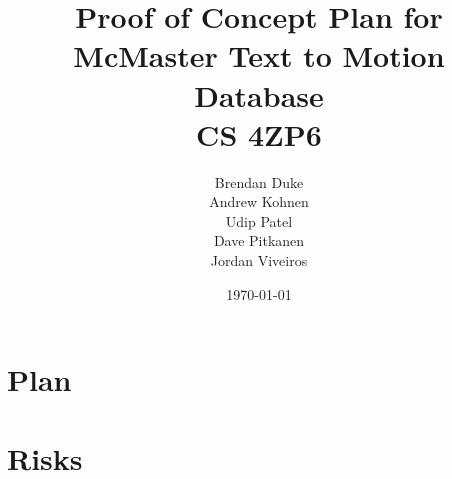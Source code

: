 \documentclass[a4paper, 12pt]{article}
\date{\today}
\title{Proof of Concept Plan for McMaster Text to Motion Database \\CS 4ZP6}
\author{Brendan Duke\\
        Andrew Kohnen\\
        Udip Patel\\
        Dave Pitkanen\\
        Jordan Viveiros}
\begin{document}
\maketitle

\section{Plan}

\section{Risks}
\end{document}
